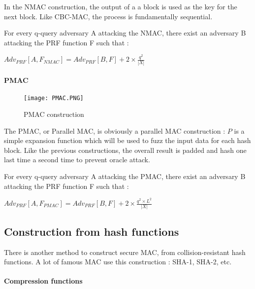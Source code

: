 In the NMAC construction, the output of a a block is used as the key for the next block. Like CBC-MAC, the process is fundamentally sequential.


\begin{mytheorem}
	For every q-query adversary A attacking the NMAC, there exist an adversary B attacking the PRF function F such that : 
	\begin{flushright}
 		$Adv_{PRF}[A,F_{NMAC}] = Adv_{PRF}[B, F] + 2\times \frac{q^2}{|X|}$	
	\end{flushright}
\end{mytheorem}



\paragraph{PMAC}

\begin{figure}[h!]
	\centering
		\texttt{[image: PMAC.PNG]}
	\caption{PMAC construction}
	\label{fig:PMACConstruction}
\end{figure}

The PMAC, or Parallel MAC, is obviously a parallel MAC construction : $P$ is a simple expansion function which will be used to fuzz the input data for each hash block. Like the previous constructions, the overall result is padded and hash one last time a second time to prevent oracle attack.

\begin{mytheorem}
	For every q-query adversary A attacking the PMAC, there exist an adversary B attacking the PRF function F such that : 
	\begin{flushright}
 		$Adv_{PRF}[A,F_{PMAC}] = Adv_{PRF}[B, F] + 2\times \frac{q^2\times L^2}{|X|}$	
	\end{flushright}
\end{mytheorem}



\subsection{Construction from hash functions}

There is another method to construct secure MAC, from collision-resistant hash functions. A lot of famous MAC use this construction : SHA-1, SHA-2, etc.

\paragraph{Compression functions}

